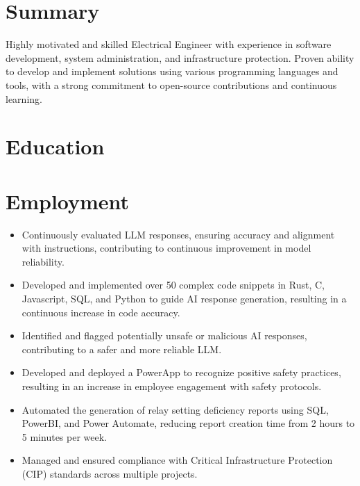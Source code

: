 \documentclass{lsanche_cv}
\begin{document}

\medskip


\smallskip


\section{Summary}
Highly motivated and skilled Electrical Engineer with experience in software development, system administration, and infrastructure protection. Proven ability to develop and implement solutions using various programming languages and tools, with a strong commitment to open-source contributions and continuous learning.

\section{Education}

\section{Employment}
\begin{itemize}
\item Continuously evaluated LLM responses, ensuring accuracy and alignment with instructions, contributing to continuous improvement in model reliability.
\item Developed and implemented over 50 complex code snippets in Rust, C, Javascript, SQL, and Python to guide AI response generation, resulting in a continuous increase in code accuracy.
\item Identified and flagged potentially unsafe or malicious AI responses, contributing to a safer and more reliable LLM.
\end{itemize}

\divider

\begin{itemize}
\item Developed and deployed a PowerApp to recognize positive safety practices, resulting in an increase in employee engagement with safety protocols.
\item Automated the generation of relay setting deficiency reports using SQL, PowerBI, and Power Automate, reducing report creation time from 2 hours to 5 minutes per week.
\item Managed and ensured compliance with Critical Infrastructure Protection (CIP) standards across multiple projects.
\end{itemize}
\end{document}
